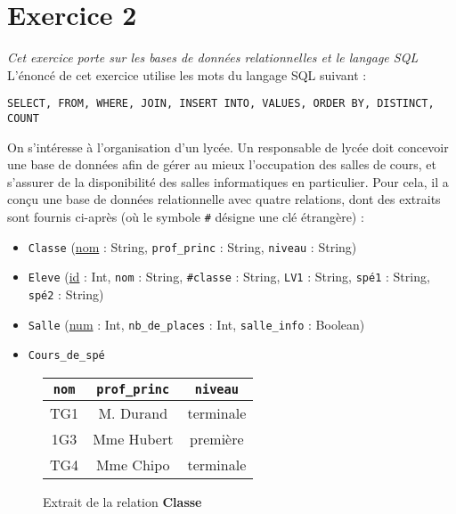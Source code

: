 \documentclass[11pt,a4paper,french,twoside]{PMCours}
\begin{document}
\section*{Exercice 2}
\emph{Cet exercice porte sur les bases de données relationnelles et le langage SQL} \medskip\\

L'énoncé de cet exercice utilise les mots du langage SQL suivant :
\begin{verbatim}
SELECT, FROM, WHERE, JOIN, INSERT INTO, VALUES, ORDER BY, DISTINCT, COUNT
\end{verbatim}

On s'intéresse à l'organisation d'un lycée. Un responsable de lycée doit concevoir une base de données afin de gérer au mieux l'occupation des salles de cours, et s'assurer de la disponibilité des salles informatiques en particulier. Pour cela, il a conçu une base de données relationnelle avec quatre relations, dont des extraits sont fournis ci-après (où le symbole \verb'#' désigne une clé étrangère) :

\begin{itemize}
\item \verb'Classe' (\underline{nom} : String, \verb'prof_princ' : String, \verb'niveau' : String)

\item \verb'Eleve' (\underline{id} : Int, \verb'nom' : String, \verb'#classe' : String, \verb'LV1' : String, \verb'spé1' : String, \verb'spé2' : String)

\item \verb'Salle' (\underline{num} : Int, \verb'nb_de_places' : Int, \verb'salle_info' : Boolean)

\item \verb'Cours_de_spé' 
\end{itemize}

\begin{figure}[h]
\begin{center}
\begin{tabular}[c]{|c|c|c|}\hline
\verb'nom' & \verb'prof_princ' & \verb'niveau'  \\\hline
TG1 & M. Durand & terminale  \\\hline
1G3 & Mme Hubert & première   \\\hline
TG4 & Mme Chipo & terminale   \\\hline
\end{tabular}
\end{center}
\caption{Extrait de la relation \textbf{Classe}}
\end{figure}
\end{document}
